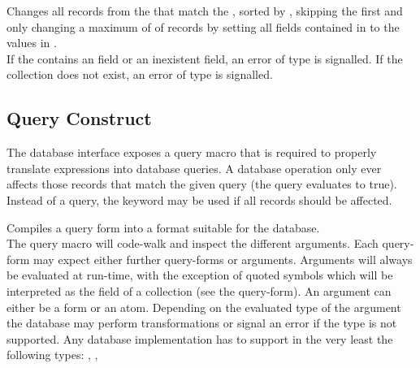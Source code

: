 Changes all records from the  that match the , sorted by , skipping the first  and only changing a maximum of  of records by setting all fields contained in  to the values in . \\

\noindent If the  contains an  field or an inexistent field, an error of type  is signalled. If the collection does not exist, an error of type  is signalled. 

\subsection{Query Construct}
The database interface exposes a query macro that is required to properly translate expressions into database queries. A database operation only ever affects those records that match the given query (the query evaluates to true). Instead of a query, the  keyword may be used if all records should be affected.

Compiles a query form into a format suitable for the database. \\

The query macro will code-walk and inspect the different arguments. Each query-form may expect either further query-forms or arguments. Arguments will always be evaluated at run-time, with the exception of quoted symbols which will be interpreted as the field of a collection (see the  query-form). An argument can either be a form or an atom. Depending on the evaluated type of the argument the database may perform transformations or signal an error if the type is not supported. Any database implementation has to support in the very least the following types: , ,  \\

